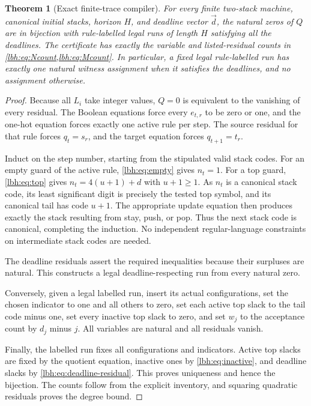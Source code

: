 \documentclass[11pt,letterpaper]{article}
\newtheorem{theorem}{Theorem}[section]
\theoremstyle{definition}
\theoremstyle{remark}
\newcommand{\1}{\mathbf 1}
\begin{document}
\begin{theorem}[Exact finite-trace compiler]\label{lbh:thm:compiler}
For every finite two-stack machine, canonical initial stacks, horizon $H$,
and deadline vector $\vec d$, the natural zeros of $Q$ are in bijection
with rule-labelled legal runs of length $H$ satisfying all the deadlines.
The certificate has exactly the variable and listed-residual counts in
\cref{lbh:eq:Ncount,lbh:eq:Mcount}. In particular, a fixed legal rule-labelled run
has exactly one natural witness assignment when it satisfies the deadlines,
and no assignment otherwise.
\end{theorem}
\begin{proof}
Because all $L_i$ take integer values, $Q=0$ is equivalent to the vanishing
of every residual. The Boolean equations force every $e_{t,r}$ to be zero
or one, and the one-hot equation forces exactly one active rule per step.
The source residual for that rule forces $q_t=s_r$, and the target equation
forces $q_{t+1}=t_r$.

Induct on the step number, starting from the stipulated valid stack codes.
For an empty guard of the active rule, \cref{lbh:eq:empty} gives $n_t=1$.
For a top guard, \cref{lbh:eq:top} gives
$n_t=4(u+1)+d$ with $u+1\ge1$. As $n_t$ is a canonical stack code, its
least significant digit is precisely the tested top symbol, and its
canonical tail has code $u+1$. The appropriate update equation then
produces exactly the stack resulting from stay, push, or pop. Thus the
next stack code is canonical, completing the induction. No independent
regular-language constraints on intermediate stack codes are needed.

The deadline residuals assert the required inequalities because their
surpluses are natural. This constructs a legal deadline-respecting run
from every natural zero.

Conversely, given a legal labelled run, insert its actual configurations,
set the chosen indicator to one and all others to zero, set each active
top slack to the tail code minus one, set every inactive top slack to
zero, and set $w_j$ to the acceptance count by $d_j$ minus $j$. All variables
are natural and all residuals vanish.

Finally, the labelled run fixes all configurations and indicators. Active
top slacks are fixed by the quotient equation, inactive ones by
\cref{lbh:eq:inactive}, and deadline slacks by \cref{lbh:eq:deadline-residual}.
This proves uniqueness and hence the bijection. The counts follow from
the explicit inventory, and squaring quadratic residuals proves the degree
bound.
\end{proof}
\end{document}
